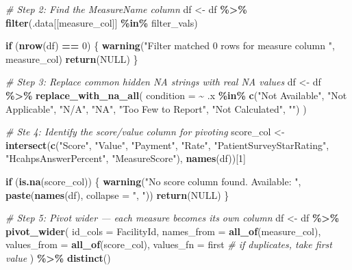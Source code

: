 \documentclass[
]{article}
\newenvironment{Shaded}{\begin{snugshade}}{\end{snugshade}}
\newcommand{\AttributeTok}[1]{\textcolor[rgb]{0.13,0.29,0.53}{#1}}
\newcommand{\CommentTok}[1]{\textcolor[rgb]{0.56,0.35,0.01}{\textit{#1}}}
\newcommand{\ConstantTok}[1]{\textcolor[rgb]{0.56,0.35,0.01}{#1}}
\newcommand{\ControlFlowTok}[1]{\textcolor[rgb]{0.13,0.29,0.53}{\textbf{#1}}}
\newcommand{\DecValTok}[1]{\textcolor[rgb]{0.00,0.00,0.81}{#1}}
\newcommand{\FunctionTok}[1]{\textcolor[rgb]{0.13,0.29,0.53}{\textbf{#1}}}
\newcommand{\NormalTok}[1]{#1}
\newcommand{\OtherTok}[1]{\textcolor[rgb]{0.56,0.35,0.01}{#1}}
\newcommand{\SpecialCharTok}[1]{\textcolor[rgb]{0.81,0.36,0.00}{\textbf{#1}}}
\newcommand{\StringTok}[1]{\textcolor[rgb]{0.31,0.60,0.02}{#1}}
\begin{document}
\begin{Shaded}
\begin{Highlighting}[]
    \CommentTok{\# Step 2: Find the MeasureName column}
\NormalTok{    df }\OtherTok{\textless{}{-}}\NormalTok{ df }\SpecialCharTok{\%\textgreater{}\%} \FunctionTok{filter}\NormalTok{(.data[[measure\_col]] }\SpecialCharTok{\%in\%}\NormalTok{ filter\_vals)}
    
    \ControlFlowTok{if}\NormalTok{ (}\FunctionTok{nrow}\NormalTok{(df) }\SpecialCharTok{==} \DecValTok{0}\NormalTok{) \{}
      \FunctionTok{warning}\NormalTok{(}\StringTok{"Filter matched 0 rows for measure column "}\NormalTok{, measure\_col)}
      \FunctionTok{return}\NormalTok{(}\ConstantTok{NULL}\NormalTok{)}
\NormalTok{    \}}
    
    
    \CommentTok{\# Step 3: Replace common hidden NA strings with real NA values}
\NormalTok{    df }\OtherTok{\textless{}{-}}\NormalTok{ df }\SpecialCharTok{\%\textgreater{}\%}
      \FunctionTok{replace\_with\_na\_all}\NormalTok{(}
        \AttributeTok{condition =} \SpecialCharTok{\textasciitilde{}}\NormalTok{ .x }\SpecialCharTok{\%in\%} \FunctionTok{c}\NormalTok{(}\StringTok{"Not Available"}\NormalTok{, }\StringTok{"Not Applicable"}\NormalTok{, }
                                \StringTok{"N/A"}\NormalTok{, }\StringTok{"NA"}\NormalTok{, }\StringTok{"Too Few to Report"}\NormalTok{, }
                                \StringTok{"Not Calculated"}\NormalTok{, }\StringTok{""}\NormalTok{)}
\NormalTok{      )}
    
    \CommentTok{\# Ste 4: Identify the score/value column for pivoting}
\NormalTok{    score\_col }\OtherTok{\textless{}{-}} \FunctionTok{intersect}\NormalTok{(}\FunctionTok{c}\NormalTok{(}\StringTok{"Score"}\NormalTok{, }\StringTok{"Value"}\NormalTok{, }\StringTok{"Payment"}\NormalTok{, }\StringTok{"Rate"}\NormalTok{,}
                                  \StringTok{"PatientSurveyStarRating"}\NormalTok{, }\StringTok{"HcahpsAnswerPercent"}\NormalTok{,}
                                  \StringTok{"MeasureScore"}\NormalTok{), }\FunctionTok{names}\NormalTok{(df))[}\DecValTok{1}\NormalTok{]}
    
    \ControlFlowTok{if}\NormalTok{ (}\FunctionTok{is.na}\NormalTok{(score\_col)) \{}
      \FunctionTok{warning}\NormalTok{(}\StringTok{"No score column found. Available: "}\NormalTok{, }
              \FunctionTok{paste}\NormalTok{(}\FunctionTok{names}\NormalTok{(df), }\AttributeTok{collapse =} \StringTok{", "}\NormalTok{))}
      \FunctionTok{return}\NormalTok{(}\ConstantTok{NULL}\NormalTok{)}
\NormalTok{    \}}
    
    \CommentTok{\# Step 5: Pivot wider — each measure becomes its own column}
\NormalTok{    df }\OtherTok{\textless{}{-}}\NormalTok{ df }\SpecialCharTok{\%\textgreater{}\%}
      \FunctionTok{pivot\_wider}\NormalTok{(}
        \AttributeTok{id\_cols     =}\NormalTok{ FacilityId,}
        \AttributeTok{names\_from  =} \FunctionTok{all\_of}\NormalTok{(measure\_col),}
        \AttributeTok{values\_from =} \FunctionTok{all\_of}\NormalTok{(score\_col),}
        \AttributeTok{values\_fn   =}\NormalTok{ first   }\CommentTok{\# if duplicates, take first value}
\NormalTok{      ) }\SpecialCharTok{\%\textgreater{}\%} 
      \FunctionTok{distinct}\NormalTok{()}
      

\end{Highlighting}
\end{Shaded}
\end{document}

